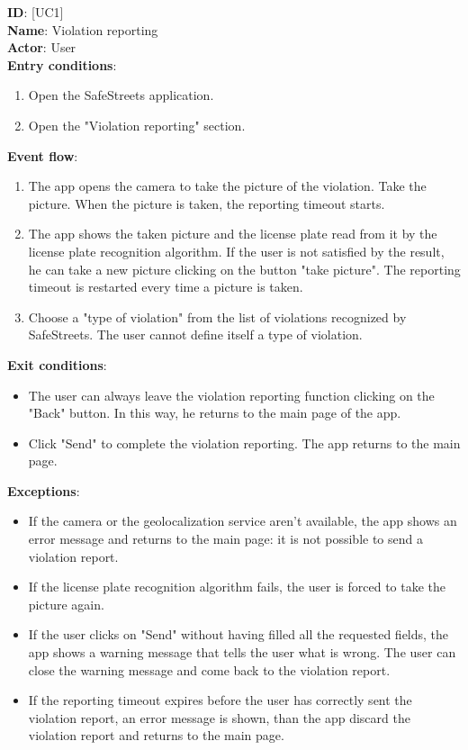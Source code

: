 \documentclass{article}
\newcommand\usecase[1]{ [UC#1] }
\begin{document}
				\textbf{ID}: \usecase{1} \\
				\textbf{Name}:   Violation reporting\\
				\textbf{Actor}:  User\\
				\textbf{Entry conditions}:
				\begin{enumerate}
					\item Open the SafeStreets application.
					\item Open the "Violation reporting" section.
				\end{enumerate}
				\textbf{Event flow}:
				\begin{enumerate}
					\item The app opens the camera to take the picture of the violation. Take the picture. When the picture is taken, the reporting timeout starts.
					\item The app shows the taken picture and the license plate read from it by the license plate recognition algorithm. If the user is not satisfied by the result, he can take a new picture clicking on the button "take picture". The reporting timeout is restarted every time a picture is taken.
					\item Choose a "type of violation" from the list of violations recognized by SafeStreets. The user cannot define itself a type of violation.
				\end{enumerate}
				\textbf{Exit conditions}:
				\begin{itemize}
					\item The user can always leave the violation reporting function clicking on the "Back" button. In this way, he returns to the main page of the app.
					\item Click "Send" to complete the violation reporting. The app returns to the main page.
				\end{itemize}
				\textbf{Exceptions}:
				\begin{itemize}
					\item If the camera or the geolocalization service aren't available, the app shows an error message and returns to the main page: it is not possible to send a violation report.
					\item If the license plate recognition algorithm fails, the user is forced to take the picture again.
					\item If the user clicks on "Send" without having filled all the requested fields, the app shows a warning message that tells the user what is wrong. The user can close the warning message and come back to the violation report. 
					\item If the reporting timeout expires before the user has correctly sent the violation report, an error message is shown, than the app discard the violation report and returns to the main page.\\
				\end{itemize}
			
\end{document}

